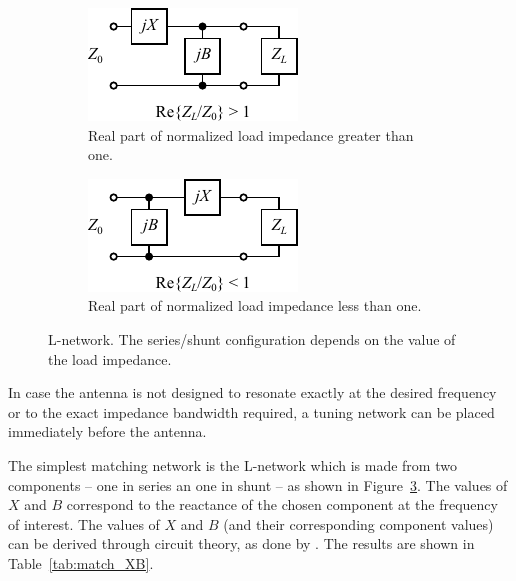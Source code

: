 \begin{figure}[htbp]
    \begin{subfigure}{0.49\linewidth}
        \centering
        \includegraphics{img/analysis/l_network_a}
        \caption{Real part of normalized load impedance greater than one.}
        \label{fig:l_network_a}
    \end{subfigure}
    \hfill
    \begin{subfigure}{0.49\linewidth}
        \centering
        \includegraphics{img/analysis/l_network_b}
        \caption{Real part of normalized load impedance less than one.}
        \label{fig:l_network_b}
    \end{subfigure}
    \caption{L-network. The series/shunt configuration depends on the value of the load impedance.}
    \label{fig:l_network}
\end{figure}
In case the antenna is not designed to resonate exactly at the desired frequency or to the exact impedance bandwidth required, a tuning network can be placed immediately before the antenna. 

The simplest matching network is the L-network which is made from two components -- one in series an one in shunt -- as shown in Figure~\ref{fig:l_network}. The values of $X$ and $B$ correspond to the reactance of the chosen component at the frequency of interest. The values of $X$ and $B$ (and their corresponding component values) can be derived through circuit theory, as done by \cite{pozar2011microwave}. The results are shown in Table~\ref{tab:match_XB}.

